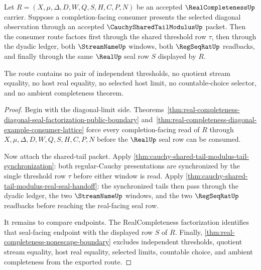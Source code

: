 \begin{theorem}
\label{thm:real-completeness-shared-tail-modulus-handoff}
Let $R=(X,\mu,\Delta,D,W,Q,S,H,C,P,N)$ be an accepted $\RealCompletenessUp$ carrier. Suppose a completion-facing consumer presents the selected diagonal observation through an accepted $\CauchySharedTailModulusUp$ packet. Then the consumer route factors first through the shared threshold row $\tau$, then through the dyadic ledger, both $\StreamNameUp$ windows, both $\RegSeqRatUp$ readbacks, and finally through the same $\RealUp$ seal row $S$ displayed by $R$.

The route contains no pair of independent thresholds, no quotient stream equality, no host real equality, no selected host limit, no countable-choice selector, and no ambient completeness theorem.
\end{theorem}
\begin{proof}
Begin with the diagonal-limit side. Theorems~\ref{thm:real-completeness-diagonal-seal-factorization-public-boundary} and~\ref{thm:real-completeness-diagonal-example-consumer-lattice} force every completion-facing read of $R$ through $X,\mu,\Delta,D,W,Q,S,H,C,P,N$ before the $\RealUp$ seal row can be consumed.

Now attach the shared-tail packet. Apply \autoref{thm:cauchy-shared-tail-modulus-tail-synchronization}: both regular-Cauchy presentations are synchronized by the single threshold row $\tau$ before either window is read. Apply \autoref{thm:cauchy-shared-tail-modulus-real-seal-handoff}: the synchronized tails then pass through the dyadic ledger, the two $\StreamNameUp$ windows, and the two $\RegSeqRatUp$ readbacks before reaching the real-facing seal row.

It remains to compare endpoints. The RealCompleteness factorization identifies that seal-facing endpoint with the displayed row $S$ of $R$. Finally, \autoref{thm:real-completeness-nonescape-boundary} excludes independent thresholds, quotient stream equality, host real equality, selected limits, countable choice, and ambient completeness from the exported route.
\end{proof}


